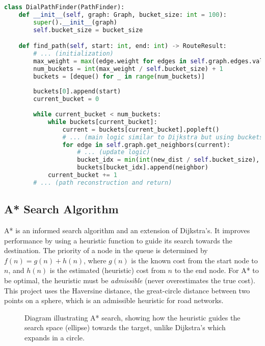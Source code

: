 \documentclass[12pt, a4paper]{report}
\begin{document}
\begin{lstlisting}[language=Python, caption={Code Snippet: `DialPathFinder' from `algorithms.py'}, label={lst:dial}]
class DialPathFinder(PathFinder):
    def __init__(self, graph: Graph, bucket_size: int = 100):
        super().__init__(graph)
        self.bucket_size = bucket_size

    def find_path(self, start: int, end: int) -> RouteResult:
        # ... (initialization)
        max_weight = max((edge.weight for edges in self.graph.edges.values() for edge in edges), default=1000)
        num_buckets = int(max_weight / self.bucket_size) + 1
        buckets = [deque() for _ in range(num_buckets)]
        
        buckets[0].append(start)
        current_bucket = 0
        
        while current_bucket < num_buckets:
            while buckets[current_bucket]:
                current = buckets[current_bucket].popleft()
                # ... (main logic similar to Dijkstra but using buckets)
                for edge in self.graph.get_neighbors(current):
                    # ... (update logic)
                    bucket_idx = min(int(new_dist / self.bucket_size), num_buckets - 1)
                    buckets[bucket_idx].append(neighbor)
            current_bucket += 1
        # ... (path reconstruction and return)
\end{lstlisting}

\subsection{A* Search Algorithm}
A* is an informed search algorithm and an extension of Dijkstra's. It improves performance by using a heuristic function to guide its search towards the destination. The priority of a node in the queue is determined by $f(n) = g(n) + h(n)$, where $g(n)$ is the known cost from the start node to $n$, and $h(n)$ is the estimated (heuristic) cost from $n$ to the end node. For A* to be optimal, the heuristic must be \textit{admissible} (never overestimates the true cost). This project uses the Haversine distance, the great-circle distance between two points on a sphere, which is an admissible heuristic for road networks.

\begin{figure}[h!]
    \centering
    \fbox{\rule{0pt}{3in}\rule{0.9\linewidth}{0pt}}
    \caption{Diagram illustrating A* search, showing how the heuristic guides the search space (ellipse) towards the target, unlike Dijkstra's which expands in a circle.}
    \label{fig:astar_diag}
\end{figure}
\end{document}
